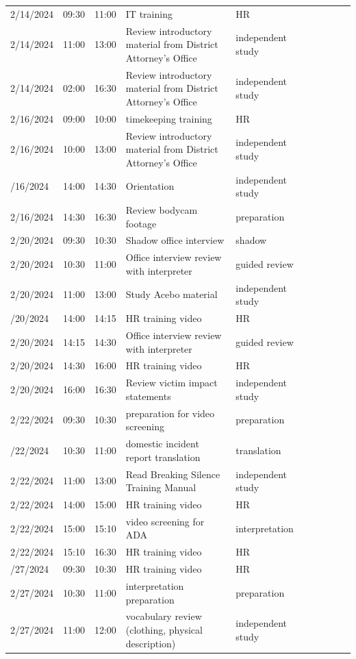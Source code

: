\documentclass{article}
\begin{document}
\begin{longtable}{lp{1.8cm} l p{5cm} l p{1.5cm} l p{5cm} l p{5cm}}
2/14/2024 & 09:30 & 11:00 & IT training & HR\\
2/14/2024 & 11:00 & 13:00 & Review introductory material from District Attorney's Office & independent study\\
2/14/2024 & 02:00 & 16:30 & Review introductory material from District Attorney's Office & independent study\\
2/16/2024 & 09:00 & 10:00 & timekeeping training & HR\\
2/16/2024 & 10:00 & 13:00 & Review introductory material from District Attorney's Office & independent study\\
\addlinespace
2/16/2024 & 14:00 & 14:30 & Orientation & independent study\\
2/16/2024 & 14:30 & 16:30 & Review bodycam footage & preparation\\
2/20/2024 & 09:30 & 10:30 & Shadow office interview & shadow\\
2/20/2024 & 10:30 & 11:00 & Office interview review with interpreter & guided review\\
2/20/2024 & 11:00 & 13:00 & Study Acebo material & independent study\\
\addlinespace
2/20/2024 & 14:00 & 14:15 & HR training video & HR\\
2/20/2024 & 14:15 & 14:30 & Office interview review with interpreter & guided review\\
2/20/2024 & 14:30 & 16:00 & HR training video & HR\\
2/20/2024 & 16:00 & 16:30 & Review victim impact statements & independent study\\
2/22/2024 & 09:30 & 10:30 & preparation for video screening & preparation\\
\addlinespace
2/22/2024 & 10:30 & 11:00 & domestic incident report translation & translation\\
2/22/2024 & 11:00 & 13:00 & Read Breaking Silence Training Manual & independent study\\
2/22/2024 & 14:00 & 15:00 & HR training video & HR\\
2/22/2024 & 15:00 & 15:10 & video screening for ADA & interpretation\\
2/22/2024 & 15:10 & 16:30 & HR training video & HR\\
\addlinespace
2/27/2024 & 09:30 & 10:30 & HR training video & HR\\
2/27/2024 & 10:30 & 11:00 & interpretation preparation & preparation\\
2/27/2024 & 11:00 & 12:00 & vocabulary review (clothing, physical description) & independent study\\

\end{longtable}
\end{document}
